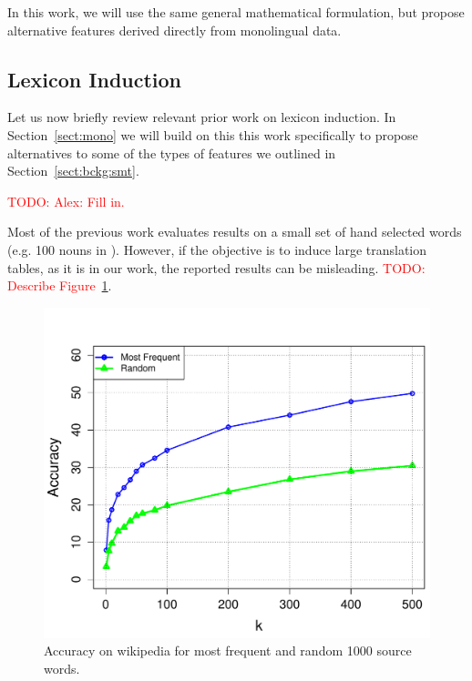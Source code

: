\documentclass[11pt]{article}
\newcommand{\mnote}[1]{\marginpar{%
  \vskip-\baselineskip
  \raggedright\footnotesize
  \itshape\hrule\smallskip\tiny{#1}\par\smallskip\hrule}}
\newcommand{\mtodo}[1]{\mnote{\textcolor{red}{#1}}}
\newcommand{\todo}[1]{\textcolor{red}{TODO: #1}}
\newcommand{\secref}[1]{Section~\ref{#1}}
\newcommand{\figref}[1]{Figure~\ref{#1}}
\begin{document}
In this work, we will use the same general mathematical formulation, but propose alternative features derived directly from monolingual data.

 \subsection{Lexicon Induction} \label{sect:bckg:lexind}
 
Let us now briefly review relevant prior work on lexicon induction.  In \secref{sect:mono} we will build on this this work specifically to propose alternatives to some of the types of features we outlined in \secref{sect:bckg:smt}.

\todo{Alex: Fill in.}

Most of the previous work evaluates results on a small set of hand selected words (e.g. 100 nouns in \cite{Rapp:1995}).  However, if the objective is to induce large translation tables, as it is in our work, the reported results can be misleading. \todo{Describe \figref{fig:lexinduct}}. \mtodo{Diss prev work, but make sure that it comes across that these features are informative.}

\begin{figure}[t]
\begin{center}
\centerline{\includegraphics[scale=0.45]{../figures/lexinduct/lexinduct.pdf}} %
\caption{Accuracy on wikipedia for most frequent and random 1000 source words. }
\label{fig:lexinduct}
\end{center}
\vskip -0.2in
\end{figure}
 
\end{document}
